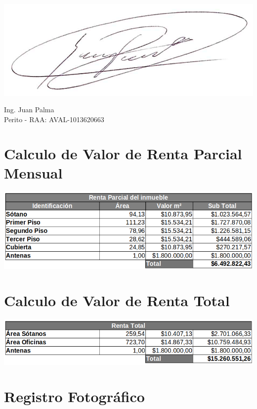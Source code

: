 \documentclass[12pt,a4paper,twoside]{article}
\begin{document}
	\includegraphics[scale=0.2]{Imagenes/Firma}


Ing. Juan Palma\\
Perito - RAA: AVAL-1013620663

\section{Calculo de Valor de Renta Parcial Mensual}

\begin{center}
\includegraphics[width=\textwidth] {Imagenes/RentaParcial1}
\end{center}

\section{Calculo de Valor de Renta Total}

\begin{center}
	\includegraphics[width=\textwidth]{Imagenes/RentaTotal1}
\end{center}

\newpage

\section{Registro Fotográfico}
\end{document}
